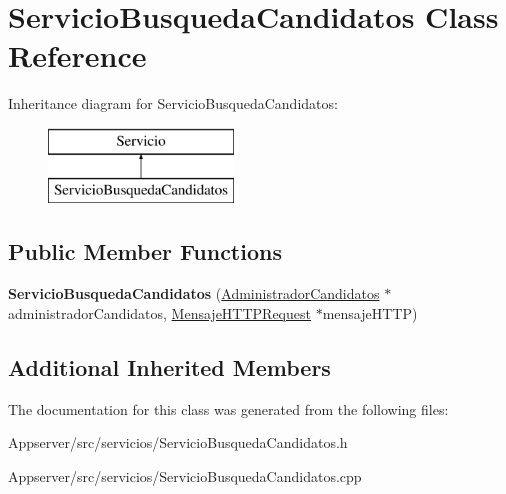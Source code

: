 \hypertarget{classServicioBusquedaCandidatos}{}\section{Servicio\+Busqueda\+Candidatos Class Reference}
\label{classServicioBusquedaCandidatos}
Inheritance diagram for Servicio\+Busqueda\+Candidatos\+:\begin{figure}[H]
\begin{center}
\leavevmode
\includegraphics[height=2.000000cm]{classServicioBusquedaCandidatos}
\end{center}
\end{figure}
\subsection*{Public Member Functions}
\begin{DoxyCompactItemize}
\item 
{\bfseries Servicio\+Busqueda\+Candidatos} (\hyperlink{classAdministradorCandidatos}{Administrador\+Candidatos} $\ast$administrador\+Candidatos, \hyperlink{classMensajeHTTPRequest}{Mensaje\+H\+T\+T\+P\+Request} $\ast$mensaje\+H\+T\+TP)\hypertarget{classServicioBusquedaCandidatos_a84dfbfc8f67a9969f34bd046ddfc5088}{}\label{classServicioBusquedaCandidatos_a84dfbfc8f67a9969f34bd046ddfc5088}

\end{DoxyCompactItemize}
\subsection*{Additional Inherited Members}


The documentation for this class was generated from the following files\+:\begin{DoxyCompactItemize}
\item 
Appserver/src/servicios/Servicio\+Busqueda\+Candidatos.\+h\item 
Appserver/src/servicios/Servicio\+Busqueda\+Candidatos.\+cpp\end{DoxyCompactItemize}
